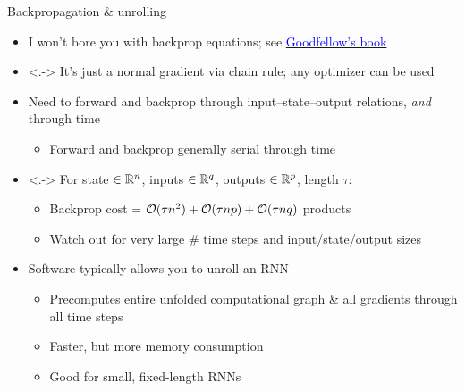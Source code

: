 \begin{frame}{Backpropagation \& unrolling}
    \begin{itemize}
        \item<+-> I won't bore you with backprop equations; see \href{http://www.deeplearningbook.org}{\textcolor{blue}{Goodfellow's book}}
        \item<.-> It's just a normal gradient via chain rule; any optimizer can be used
        \item<+-> Need to forward and backprop through input--state--output relations, \emph{and} through time
        \begin{itemize}
            \item Forward and backprop generally serial through time
        \end{itemize}
        \item<.-> For state $\in \mathbb{R}^n$, inputs $\in \mathbb{R}^q$, outputs $\in \mathbb{R}^p$, length $\tau$:
        \begin{itemize}
            \item Backprop cost = $\mathcal{O}(\tau n^2) + \mathcal{O}(\tau n p) + \mathcal{O}(\tau n q)$ products
            \item Watch out for very large \# time steps and input/state/output sizes
        \end{itemize}
        \item<+-> Software typically allows you to \alert{unroll} an RNN{}
        \begin{itemize}
            \item Precomputes entire unfolded computational graph \& all gradients through all time steps
            \item Faster, but more memory consumption
            \item Good for small, fixed-length RNN{}s
        \end{itemize}
    \end{itemize}
\end{frame}

